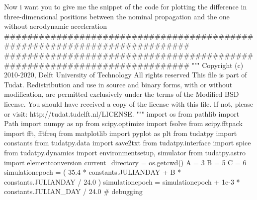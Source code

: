 {}
\markdownRendererSectionEnd \markdownRendererSectionBegin
{}\markdownRendererInterblockSeparator
{}Now i want you to give me the snippet of the code for plotting the difference in three-dimensional positions between the nominal propagation and the one without aerodynamic acceleration\markdownRendererInterblockSeparator
{}###########################################################################\markdownRendererInterblockSeparator
{}
\markdownRendererSectionEnd 
\markdownRendererSectionEnd \markdownRendererSectionBegin
\markdownRendererHeadingOne{}\markdownRendererInterblockSeparator
{}
\markdownRendererSectionEnd \markdownRendererSectionBegin
{}\markdownRendererInterblockSeparator
{}
\markdownRendererSectionEnd \markdownRendererSectionBegin
\markdownRendererHeadingOne{}\markdownRendererInterblockSeparator
{}
\markdownRendererSectionEnd \markdownRendererSectionBegin
{}\markdownRendererInterblockSeparator
{}
\markdownRendererSectionEnd \markdownRendererSectionBegin
\markdownRendererHeadingOne{}\markdownRendererInterblockSeparator
{}########################################################################### """ Copyright (c) 2010-2020, Delft University of Technology All rights reserved This file is part of Tudat. Redistribution and use in source and binary forms, with or without modification, are permitted exclusively under the terms of the Modified BSD license. You should have received a copy of the license with this file. If not, please or visit: http://tudat.tudelft.nl/LICENSE. """ import os from pathlib import Path import numpy as np from scipy.optimize import fsolve from scipy.fftpack import fft, fftfreq from matplotlib import pyplot as plt from tudatpy import constants from tudatpy.data import save2txt from tudatpy.interface import spice from tudatpy.dynamics import environmentsetup, simulator from tudatpy.astro import elementconversion\markdownRendererInterblockSeparator
{}
\markdownRendererSectionEnd \markdownRendererSectionBegin
{}\markdownRendererInterblockSeparator
{}current_directory = os.getcwd()\markdownRendererInterblockSeparator
{}
\markdownRendererSectionEnd \markdownRendererSectionBegin
{}\markdownRendererInterblockSeparator
{}A = 3 B = 5 C = 6 simulationepoch = ( 35.4 * constants.JULIANDAY + B * constants.JULIANDAY / 24.0 ) simulationepoch = simulationepoch + 1e-3 * constants.JULIAN_DAY / 24.0 # debugging\markdownRendererInterblockSeparator
